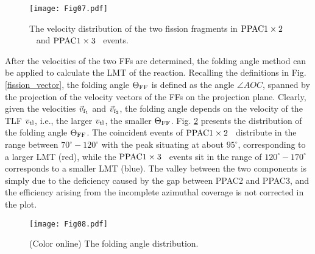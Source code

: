 \documentclass[submitting]{nst}
\def\pacab{${\rm PPAC 1\times 2}$}
\def\pacac{${\rm PPAC 1\times 3}$}
\begin{document}
\begin{figure}[!htb]
\texttt{[image: Fig07.pdf]}
\caption{The velocity distribution of the two fission fragments in \pacab~ and \pacac~ events. }
\label{v_rec}
\end{figure}


After the velocities of the two FFs are determined, the folding angle method can be applied to calculate the LMT of the reaction. Recalling the definitions  in Fig. \ref{fission_vector}, the folding angle $\Theta_{\rm FF}$ is defined as the angle $\angle AOC$,  spanned by the projection of the velocity vectors of the  FFs on the projection plane. Clearly, given the velocities  $\vec{v}_{\rm f_1}$ and  $\vec{v}_{\rm f_2}$, the folding angle depends on the velocity of the TLF $v_{\rm tl}$, i.e., the larger $v_{\rm tl}$, the smaller  $\Theta_{\rm FF}$. Fig. \ref{folding} presents the distribution of the folding angle $\Theta_{\rm FF}$. The coincident events of \pacab~ distribute in the range between $70^{\circ}-120^{\circ}$ with the peak situating at about $95^{\circ}$, corresponding to a larger LMT (red), while the  \pacac~ events sit in the range of $120^{\circ}-170^{\circ}$  corresponds to a smaller LMT (blue).  The valley between the two components  is simply due to the deficiency caused by the  gap between PPAC2 and PPAC3, and the efficiency arising from the incomplete azimuthal coverage is not corrected in the plot.

\begin{figure}[!htb]
\texttt{[image: Fig08.pdf]}
\caption{(Color online) The folding angle distribution.}
\label{folding}
\end{figure}
\end{document}
